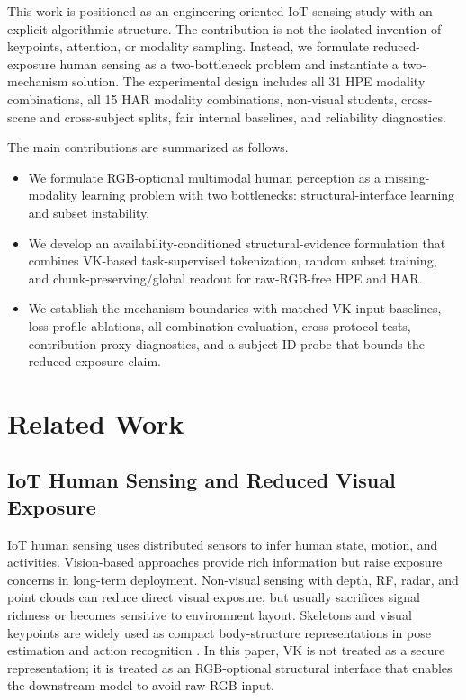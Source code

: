 ﻿\documentclass[journal]{IEEEtran}
\begin{document}
This work is positioned as an engineering-oriented IoT sensing study with an explicit algorithmic structure. The contribution is not the isolated invention of keypoints, attention, or modality sampling. Instead, we formulate reduced-exposure human sensing as a two-bottleneck problem and instantiate a two-mechanism solution. The experimental design includes all 31 HPE modality combinations, all 15 HAR modality combinations, non-visual students, cross-scene and cross-subject splits, fair internal baselines, and reliability diagnostics.

The main contributions are summarized as follows.
\begin{itemize}
    \item We formulate RGB-optional multimodal human perception as a missing-modality learning problem with two bottlenecks: structural-interface learning and subset instability.
    \item We develop an availability-conditioned structural-evidence formulation that combines VK-based task-supervised tokenization, random subset training, and chunk-preserving/global readout for raw-RGB-free HPE and HAR.
    \item We establish the mechanism boundaries with matched VK-input baselines, loss-profile ablations, all-combination evaluation, cross-protocol tests, contribution-proxy diagnostics, and a subject-ID probe that bounds the reduced-exposure claim.
\end{itemize}

\section{Related Work}

\subsection{IoT Human Sensing and Reduced Visual Exposure}
IoT human sensing uses distributed sensors to infer human state, motion, and activities. Vision-based approaches provide rich information but raise exposure concerns in long-term deployment. Non-visual sensing with depth, RF, radar, and point clouds can reduce direct visual exposure, but usually sacrifices signal richness or becomes sensitive to environment layout. Skeletons and visual keypoints are widely used as compact body-structure representations in pose estimation and action recognition \cite{openpose,stgcn}. In this paper, VK is not treated as a secure representation; it is treated as an RGB-optional structural interface that enables the downstream model to avoid raw RGB input.
\end{document}
